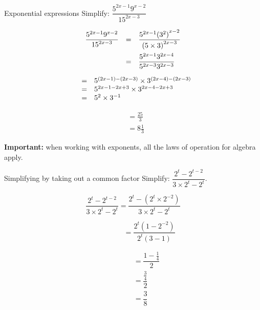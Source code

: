      
\begin{wex}
{Exponential expressions}
{Simplify: $\dfrac{{5}^{2x-1}  {9}^{x-2}}{{15}^{2x-3}}$}
{
\begin{equation*}
\begin{array}{lcl} \dfrac{{5}^{2x-1}  {9}^{x-2}}{{15}^{2x-3}}& =& \dfrac{{5}^{2x-1}  {({3}^{2})}^{x-2}}{{(5\times3)}^{2x-3}}\hfill \vspace{5pt}\\
		  & =& \dfrac{{5}^{2x-1}  {3}^{2x-4}}{{5}^{2x-3}  {3}^{2x-3}}\hfill 
\end{array}
\end{equation*}
  
\begin{equation*}
\begin{array}{lcl}
& =& {5}^{(2x-1)-(2x-3)} \times {3}^{(2x-4)-(2x-3)}\hfill \\ 
& =& 5^{2x-1-2x+3} \times 3^{2x-4 - 2x+3} \\
& =& {5}^{2} \times {3}^{-1}\hfill \end{array}
\end{equation*}


\begin{align*}
  &= \frac{25}{3} \\
  &= 8\frac{1}{3}
\end{align*}
}
\end{wex}

\textbf{Important:} when working with exponents, all the laws of operation for algebra apply.

\begin{wex}
{Simplifying by taking out a common factor}
{Simplify: $\dfrac{2^t-2^{t-2}}{3 \times 2^t - 2^t}$.}
{%
\begin{equation*}
  \dfrac{2^t-2^{t-2}}{3 \times 2^t-2^t} =
  \dfrac{2^t-(2^t \times 2^{-2})}{3 \times 2^t - 2^t}
\end{equation*}

\begin{equation*}
  \phantom{\frac{2^t-2^{t-2}}{3 \times 2^t-2^t}} = \frac{2^t(1-2^{-2})}{2^t(3-1)}
\end{equation*}

\begin{align*}
  \phantom{\frac{2^t-2^{t-2}}{3.2^t-2^t}}
  &= \dfrac{1- \frac{1}{4}}{2} \\
  &= \dfrac{\frac{3}{4}}{2} \\
  &= \dfrac{3}{8} 
\end{align*}
} 
\end{wex}


